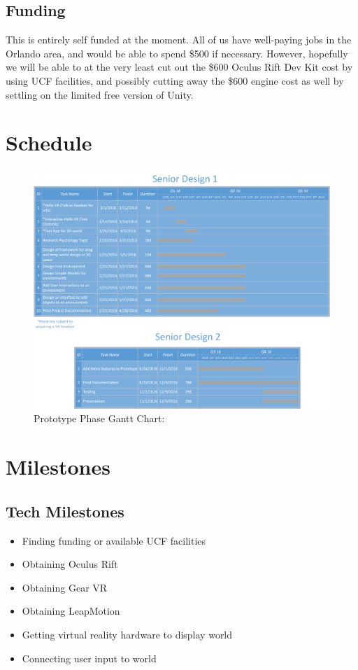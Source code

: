 \documentclass[a4paper,10pt]{article}
\begin{document}
			    \subsection{Funding}
			    This is entirely self funded at the moment.  All of us have well-paying jobs in the 
			    Orlando area, and would be able to spend \$500 if necessary.  However, hopefully we will be able to at the very least cut out the 
			    \$600 Oculus Rift Dev Kit cost by using UCF facilities, and possibly cutting away the \$600 engine cost as well by settling on the limited free version of Unity.  
	\section{Schedule}
	\begin{figure}[H]
	\includegraphics[width=\linewidth]{scheduleSR.png}
	\caption{Prototype Phase Gantt Chart:}
	\label{fig:pchart}
	\end{figure}
	\section{Milestones}
	\subsection{Tech Milestones}
		\begin{itemize}
			\item Finding funding or available UCF facilities
			\item Obtaining Oculus Rift
			\item Obtaining Gear VR
			\item Obtaining LeapMotion
			\item Getting virtual reality hardware to display world
			\item Connecting user input to world
		\end{itemize}
\end{document}
